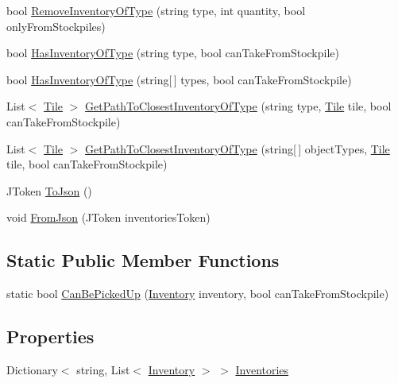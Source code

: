 \begin{DoxyCompactItemize}
bool \hyperlink{class_inventory_manager_a182cd5c48f9c02fc6e861e7d7d9253b4}{Remove\+Inventory\+Of\+Type} (string type, int quantity, bool only\+From\+Stockpiles)
\item 
bool \hyperlink{class_inventory_manager_a23e1c7bb3b2d1b76ff7fbc4dd8fa7ce7}{Has\+Inventory\+Of\+Type} (string type, bool can\+Take\+From\+Stockpile)
\item 
bool \hyperlink{class_inventory_manager_ac53142bd7a209ed38b5ddf32345038a1}{Has\+Inventory\+Of\+Type} (string\mbox{[}$\,$\mbox{]} types, bool can\+Take\+From\+Stockpile)
\item 
List$<$ \hyperlink{class_tile}{Tile} $>$ \hyperlink{class_inventory_manager_a3924e3be39b67aaa47ba850228917814}{Get\+Path\+To\+Closest\+Inventory\+Of\+Type} (string type, \hyperlink{class_tile}{Tile} tile, bool can\+Take\+From\+Stockpile)
\item 
List$<$ \hyperlink{class_tile}{Tile} $>$ \hyperlink{class_inventory_manager_a0baa049dc3137ae1fd8451c4b89fefaa}{Get\+Path\+To\+Closest\+Inventory\+Of\+Type} (string\mbox{[}$\,$\mbox{]} object\+Types, \hyperlink{class_tile}{Tile} tile, bool can\+Take\+From\+Stockpile)
\item 
J\+Token \hyperlink{class_inventory_manager_af9628c4fb140e7d64c3b423e09cfd20b}{To\+Json} ()
\item 
void \hyperlink{class_inventory_manager_af330aa2148c2e803960a01f4a8ab9f73}{From\+Json} (J\+Token inventories\+Token)
\end{DoxyCompactItemize}
\subsection*{Static Public Member Functions}
\begin{DoxyCompactItemize}
\item 
static bool \hyperlink{class_inventory_manager_a11f61f89cbd6c1525960f18dd2726d6f}{Can\+Be\+Picked\+Up} (\hyperlink{class_inventory}{Inventory} inventory, bool can\+Take\+From\+Stockpile)
\end{DoxyCompactItemize}
\subsection*{Properties}
\begin{DoxyCompactItemize}
\item 
Dictionary$<$ string, List$<$ \hyperlink{class_inventory}{Inventory} $>$ $>$ \hyperlink{class_inventory_manager_aad6432658749465392014c8142109b57}{Inventories}
\end{DoxyCompactItemize}
